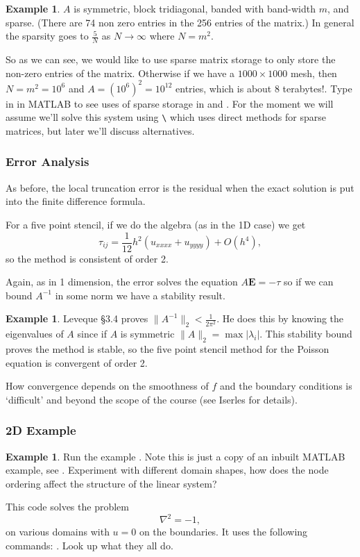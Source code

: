 \documentclass[12pt, a4paper]{article}
\renewcommand{\vec}[1]{\mathbf{#1}}
\theoremstyle{definition}
\newtheorem{example}[thm]{Example}
\theoremstyle{remark}
\numberwithin{equation}{section}
\begin{document}
\begin{example}
$A$ is symmetric, block tridiagonal, banded with band-width $m$, and sparse. (There are 74 non zero entries in the 256 entries of the matrix.) In general the sparsity goes to $\frac{5}{N}$ as $N \to \infty$ where $N=m^2$.
\end{example}

So as we can see, we would like to use sparse matrix storage to only store the non-zero entries of the matrix. Otherwise if we have a $1000 \times 1000$ mesh, then $N=m^2=10^6$ and $A=(10^6)^2=10^{12}$ entries, which is about 8 terabytes!. Type in  in MATLAB to see uses of sparse storage in  and . For the moment we will assume we'll solve this system using \verb+\+ which uses direct methods for sparse matrices, but later we'll discuss alternatives. 


\newpage

\subsubsection{Error Analysis}

As before, the local truncation error is the residual when the exact solution is put into the finite difference formula.

For a five point stencil, if we do the algebra (as in the 1D case) we get
\[\tau_{ij}=\frac{1}{12}h^2(u_{xxxx}+u_{yyyy})+O(h^4),\]
so the method  is consistent of order 2.

Again, as in 1 dimension, the error solves the equation $A \vec{E} = -\tau$ so if we can bound  $A^{-1}$ in some norm  we have a stability result. 
\begin{example}
 Leveque  \S 3.4 proves $\|A^{-1}\|_2 <\frac{1}{2 \pi^2}$. He does this by knowing the eigenvalues of $A$ since if $A$ is symmetric  $\|A\|_2=\operatorname{max}|\lambda_i|$.
This stability bound proves the method is stable, so the five point stencil method for the Poisson equation is convergent of order 2.
\end{example}

How convergence depends on the smoothness of $f$ and the boundary conditions is `difficult'  and beyond the scope of the course (see Iserles for details).

\newpage

\subsubsection{2D Example}

 \begin{example}
 Run the example . Note this is just a copy of an inbuilt MATLAB example, see . Experiment with different domain shapes, how does the node ordering affect the structure of the linear system?

 This code solves the problem
 \[  \nabla^2 = -1, \]
 on various domains with $u=0$ on the boundaries.
 It uses the following commands: . 
 Look up what they all do.  
 \end{example}
  
\end{document}
